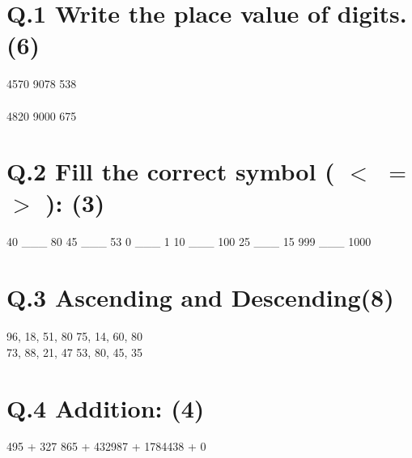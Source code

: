 \documentclass[12pt,a4paper]{article}
\begin{document}
\section*{Q.1 Write the place value of digits.(6)}
\begin{enumerate} 4570 \hspace{150} 9078 \hspace{150} 538 \\
\vspace{30} \\ 
4820 \hspace{150} 9000 \hspace{150} 675 \\
\vspace{15} 
\end{enumerate}
\section*{Q.2 Fill the correct symbol ( $<$ $=$ $>$ ): (3)}
\begin{enumerate}
    40 \_\_\_ 80  \hspace{20} 45 \_\_\_ 53 \hspace{20} 0 \_\_\_ 1 \hspace{20} 10 \_\_\_ 100 \hspace{20} 25 \_\_\_ 15 \hspace{20} 999 \_\_\_ 1000 
\end{enumerate}
\section*{Q.3 Ascending and Descending(8) }
\begin{enumerate} 96, 18, 51, 80  \hspace{150} 75, 14, 60, 80
\\  73, 88, 21, 47  \hspace{150}  53, 80, 45, 35 
\end{enumerate}
\section*{Q.4 Addition: (4)}
\begin{enumerate}
    495 + 327\hspace{60} 865 + 432\hspace{60}987 + 1784\hspace{60}438 + 0\\
    \vspace{19}
\end{enumerate}
\end{document}
